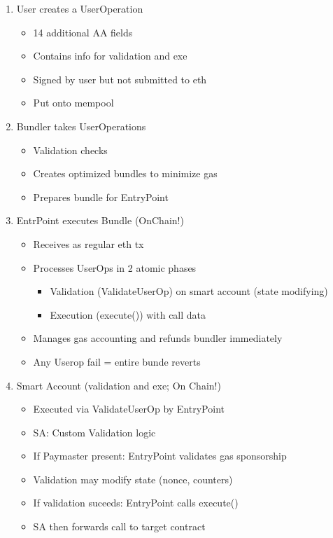 \documentclass[../Main.tex]{subfiles}
\begin{document}
\begin{enumerate}
    \item User creates a UserOperation
          \begin{itemize}
              \item 14 additional AA fields
              \item Contains info for validation and exe
              \item Signed by user but not submitted to eth
              \item Put onto mempool
          \end{itemize}
    \item Bundler takes UserOperations
          \begin{itemize}
              \item Validation checks
              \item Creates optimized bundles to minimize gas
              \item Prepares bundle for EntryPoint
          \end{itemize}
    \item EntrPoint executes Bundle (OnChain!)
          \begin{itemize}
              \item Receives as regular eth tx
              \item Processes UserOps in 2 atomic phases
                    \begin{itemize}
                        \item Validation (ValidateUserOp) on smart account (state modifying)
                        \item Execution (execute()) with call data
                    \end{itemize}
              \item Manages gas accounting and refunds bundler immediately
              \item Any Userop fail = entire bunde reverts
          \end{itemize}
    \item Smart Account (validation and exe; On Chain!)
          \begin{itemize}
              \item Executed via ValidateUserOp by EntryPoint
              \item SA: Custom Validation logic
              \item If Paymaster present: EntryPoint validates gas sponsorship
              \item Validation may modify state (nonce, counters)
              \item If validation suceeds: EntryPoint calls execute()
              \item SA then forwards call to target contract
          \end{itemize}
\end{enumerate}
\end{document}
